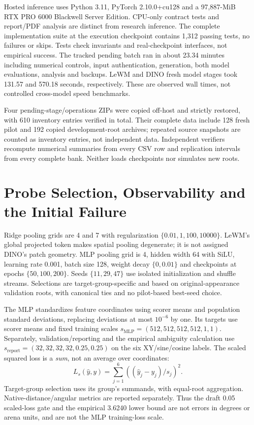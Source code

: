 Hosted inference uses Python 3.11, PyTorch 2.10.0+cu128 and a 97,887-MiB RTX PRO
6000 Blackwell Server Edition. CPU-only contract tests and report/PDF analysis
are distinct from research inference. The complete implementation suite at the
execution checkpoint contains 1,312 passing tests, no failures or skips. Tests
check invariants and real-checkpoint interfaces, not empirical success. The
tracked pending batch ran in about 23.34 minutes including numerical controls,
input authentication, generation, both model evaluations, analysis and backups.
LeWM and DINO fresh model stages took 131.57 and 570.18 seconds, respectively.
These are observed wall times, not controlled cross-model speed benchmarks.

Four pending-stage/operations ZIPs were copied off-host and strictly restored,
with 610 inventory entries verified in total. Their complete data include 128
fresh pilot and 192 copied development-root archives; repeated source snapshots
are counted as inventory entries, not independent data. Independent verifiers
recompute numerical summaries from every CSV row and replication intervals
from every complete bank. Neither loads checkpoints nor simulates new roots.

\section{Probe Selection, Observability and the Initial Failure}
\label{app:probes}

Ridge pooling grids are 4 and 7 with regularization
$\{0.01,1,100,10000\}$. LeWM's global projected token makes spatial pooling
degenerate; it is not assigned DINO's patch geometry. MLP pooling grid is 4,
hidden width 64 with SiLU, learning rate 0.001, batch size 128, weight decay
$\{0,0.01\}$ and checkpoints at epochs $\{50,100,200\}$. Seeds
$\{11,29,47\}$ use isolated initialization and shuffle streams. Selections
are target-group-specific and based on original-appearance validation roots,
with canonical ties and no pilot-based best-seed choice.

The MLP standardizes feature coordinates using scorer means and population
standard deviations, replacing deviations at most $10^{-6}$ by one. Its
targets use scorer means and fixed training scales
$s_{\mathrm{MLP}}=(512,512,512,512,1,1)$. Separately, validation/reporting and
the empirical ambiguity calculation use
$s_{\mathrm{report}}=(32,32,32,32,0.25,0.25)$ on the six XY/sine/cosine labels.
The scaled squared loss is a \emph{sum}, not an average over coordinates:
\begin{equation}
 L_s(\hat y,y)=\sum_{j=1}^{6}\left((\hat y_j-y_j)/s_j\right)^2.
\end{equation}
Target-group selection uses its group's summands, with equal-root aggregation.
Native-distance/angular metrics are reported separately. Thus the draft 0.05
scaled-loss gate and the empirical 3.6240 lower bound are not errors in degrees
or arena units, and are not the MLP training-loss scale.

